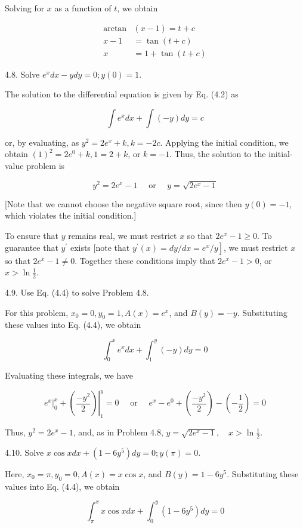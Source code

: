 \documentclass[10pt]{article}
\begin{document}
Solving for $x$ as a function of $t$, we obtain

$$
\begin{aligned}
\arctan & (x-1)=t+c \\
x-1 & =\tan (t+c) \\
x & =1+\tan (t+c)
\end{aligned}
$$

4.8. Solve $e^{x} d x-y d y=0 ; y(0)=1$.

The solution to the differential equation is given by Eq. (4.2) as

$$
\int e^{x} d x+\int(-y) d y=c
$$

or, by evaluating, as $y^{2}=2 e^{x}+k, k=-2 c$. Applying the initial condition, we obtain $(1)^{2}=2 e^{0}+k, 1=2+k$, or $k=-1$. Thus, the solution to the initial-value problem is

$$
y^{2}=2 e^{x}-1 \quad \text { or } \quad y=\sqrt{2 e^{x}-1}
$$

[Note that we cannot choose the negative square root, since then $y(0)=-1$, which violates the initial condition.]

To ensure that $y$ remains real, we must restrict $x$ so that $2 e^{x}-1 \geq 0$. To guarantee that $y^{\prime}$ exists [note that $\left.y^{\prime}(x)=d y / d x=e^{x} / y\right]$, we must restrict $x$ so that $2 e^{x}-1 \neq 0$. Together these conditions imply that $2 e^{x}-1>0$, or $x>\ln \frac{1}{2}$.

4.9. Use Eq. (4.4) to solve Problem 4.8.

For this problem, $x_{0}=0, y_{0}=1, A(x)=e^{x}$, and $B(y)=-y$. Substituting these values into Eq. (4.4), we obtain

$$
\int_{0}^{x} e^{x} d x+\int_{1}^{y}(-y) d y=0
$$

Evaluating these integrals, we have

$$
\left.e^{x}\right|_{0} ^{x}+\left.\left(\frac{-y^{2}}{2}\right)\right|_{1} ^{y}=0 \quad \text { or } \quad e^{x}-e^{0}+\left(\frac{-y^{2}}{2}\right)-\left(-\frac{1}{2}\right)=0
$$

Thus, $y^{2}=2 e^{x}-1$, and, as in Problem 4.8, $y=\sqrt{2 e^{x}-1}, \quad x>\ln \frac{1}{2}$.

4.10. Solve $x \cos x d x+\left(1-6 y^{5}\right) d y=0 ; y(\pi)=0$.

Here, $x_{0}=\pi, y_{0}=0, A(x)=x \cos x$, and $B(y)=1-6 y^{5}$. Substituting these values into Eq. (4.4), we obtain

$$
\int_{\pi}^{x} x \cos x d x+\int_{0}^{y}\left(1-6 y^{5}\right) d y=0
$$
\end{document}
